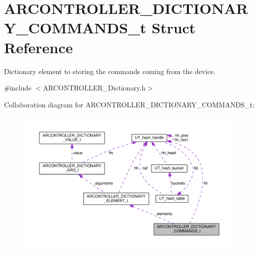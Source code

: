 \hypertarget{struct_a_r_c_o_n_t_r_o_l_l_e_r___d_i_c_t_i_o_n_a_r_y___c_o_m_m_a_n_d_s__t}{}\section{A\+R\+C\+O\+N\+T\+R\+O\+L\+L\+E\+R\+\_\+\+D\+I\+C\+T\+I\+O\+N\+A\+R\+Y\+\_\+\+C\+O\+M\+M\+A\+N\+D\+S\+\_\+t Struct Reference}
\label{struct_a_r_c_o_n_t_r_o_l_l_e_r___d_i_c_t_i_o_n_a_r_y___c_o_m_m_a_n_d_s__t}


Dictionary element to storing the commands coming from the device.  




{\ttfamily \#include $<$A\+R\+C\+O\+N\+T\+R\+O\+L\+L\+E\+R\+\_\+\+Dictionary.\+h$>$}



Collaboration diagram for A\+R\+C\+O\+N\+T\+R\+O\+L\+L\+E\+R\+\_\+\+D\+I\+C\+T\+I\+O\+N\+A\+R\+Y\+\_\+\+C\+O\+M\+M\+A\+N\+D\+S\+\_\+t\+:
\nopagebreak
\begin{figure}[H]
\begin{center}
\leavevmode
\includegraphics[width=350pt]{struct_a_r_c_o_n_t_r_o_l_l_e_r___d_i_c_t_i_o_n_a_r_y___c_o_m_m_a_n_d_s__t__coll__graph}
\end{center}
\end{figure}
